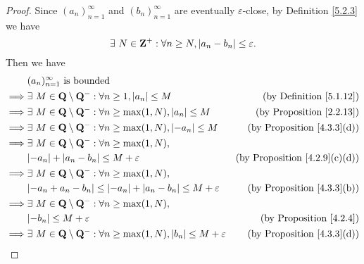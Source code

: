 \begin{proof}
    Since \((a_n)_{n = 1}^{\infty}\) and \((b_n)_{n = 1}^{\infty}\) are eventually \(\varepsilon\)-close, by Definition \ref{5.2.3} we have
    \[
        \exists\ N \in \mathbf{Z}^+ : \forall n \geq N, \abs*{a_n - b_n} \leq \varepsilon.
    \]
    Then we have
    \begin{align*}
                 & (a_n)_{n = 1}^\infty \text{ is bounded}                                                                                                                   \\
        \implies & \exists\ M \in \mathbf{Q} \setminus \mathbf{Q}^- : \forall n \geq 1, \abs*{a_n} \leq M                        & \text{(by Definition \ref{5.1.12})}       \\
        \implies & \exists\ M \in \mathbf{Q} \setminus \mathbf{Q}^- : \forall n \geq \max(1, N), \abs*{a_n} \leq M               & \text{(by Proposition \ref{2.2.13})}      \\
        \implies & \exists\ M \in \mathbf{Q} \setminus \mathbf{Q}^- : \forall n \geq \max(1, N), \abs*{-a_n} \leq M              & \text{(by Proposition \ref{4.3.3}(d))}    \\
        \implies & \exists\ M \in \mathbf{Q} \setminus \mathbf{Q}^- : \forall n \geq \max(1, N),                                                                             \\
                 & \abs*{-a_n} + \abs*{a_n - b_n} \leq M + \varepsilon                                                           & \text{(by Proposition \ref{4.2.9}(c)(d))} \\
        \implies & \exists\ M \in \mathbf{Q} \setminus \mathbf{Q}^- : \forall n \geq \max(1, N),                                                                             \\
                 & \abs*{-a_n + a_n - b_n} \leq \abs*{-a_n} + \abs*{a_n - b_n} \leq M + \varepsilon                              & \text{(by Proposition \ref{4.3.3}(b))}    \\
        \implies & \exists\ M \in \mathbf{Q} \setminus \mathbf{Q}^- : \forall n \geq \max(1, N),                                                                             \\
                 & \abs*{-b_n} \leq M + \varepsilon                                                                              & \text{(by Proposition \ref{4.2.4})}       \\
        \implies & \exists\ M \in \mathbf{Q} \setminus \mathbf{Q}^- : \forall n \geq \max(1, N), \abs*{b_n} \leq M + \varepsilon & \text{(by Proposition \ref{4.3.3}(d))}    \\

\end{align*}
\end{proof}
